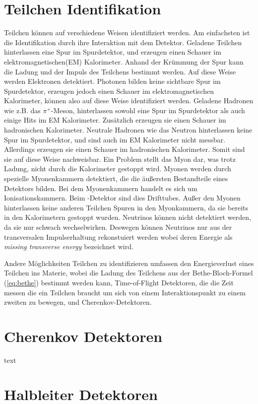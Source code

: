 \section{Teilchen Identifikation}
Teilchen können auf verschiedene Weisen identifiziert werden. Am einfachsten ist die Identifikation durch ihre Interaktion mit dem Detektor. Geladene Teilchen hinterlassen eine Spur im Spurdetektor, und erzeugen einen Schauer im elektromagnetischen(EM) Kalorimeter. Anhand der Krümmung der Spur kann die Ladung und der Impuls des Teilchens bestimmt werden. Auf diese Weise werden Elektronen detektiert. Photonen bilden keine sichtbare Spur im Spurdetektor, erzeugen jedoch einen Schauer im elektromagnetischen Kalorimeter, können also auf diese Weise identifiziert werden. Geladene Hadronen wie z.B. das $\pi^+$-Meson, hinterlassen sowohl eine Spur im Spurdetektor als auch einige Hits im EM Kalorimeter. Zusätzlich erzeugen sie einen Schauer im hadronischen Kalorimeter. Neutrale Hadronen wie das Neutron hinterlassen keine Spur im Spurdetektor, und sind auch im EM Kalorimeter nicht messbar. Allerdings erzeugen sie einen Schauer im hadronischen Kalorimeter. Somit sind sie auf diese Weise nachweisbar. Ein Problem stellt das Myon dar, was trotz Ladung, nicht durch die Kalorimeter gestoppt wird. Myonen werden durch spezielle Myonenkammern detektiert, die die äußersten Bestandteile eines Detektors bilden. Bei dem Myonenkammern handelt es sich um Ionisationskammern. Beim \atlas-Detektor sind dies Drifttubes. Außer den Myonen hinterlassen keine anderen Teilchen Spuren in den Myonkammern, da sie bereits in den Kalorimetern gestoppt wurden.
Neutrinos können nicht detektiert werden, da sie nur schwach wechselwirken. Deswegen können Neutrinos nur aus der transversalen Impulserhaltung rekonstuiert werden wobei deren Energie als \emph{missing transverse energy} \MET bezeichnet wird.

Andere Möglichkeiten Teilchen zu identifizieren umfassen den Energieverlust eines Teilchen ins Materie, wobei die Ladung des Teilchens aus der Bethe-Bloch-Formel (\ref{eq:bethe}) bestimmt werden kann, Time-of-Flight Detektoren, die die Zeit messen die ein Teilchen braucht um sich von einem Interaktionspunkt zu einem zweiten zu bewegen, und Cherenkov-Detektoren. 

\section{Cherenkov Detektoren}
text
\section{Halbleiter Detektoren}
